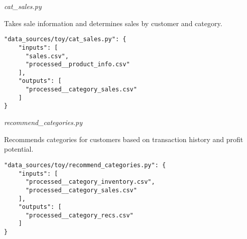 \documentclass{llncs}
\newcommand{\+}{\discretionary{\mbox{${\bm\cdot}\mkern-1mu$}}{}{}}
\begin{document}
\begin{description}
   \item \textit{cat\_sales.py}
   \item[Description:] Takes sale information and determines sales by customer and category.
   \item[Results:] 
\end{description}
\begin{lstlisting}
"data_sources/toy/cat_sales.py": {
    "inputs": [
      "sales.csv",
      "processed__product_info.csv"
    ],
    "outputs": [
      "processed__category_sales.csv"
    ]
}
   \end{lstlisting}

\begin{description}
   \item \textit{recommend\_categories.py}
   \item[Description:] Recommends categories for customers based on transaction history and profit potential.
   \item[Results:] 
\end{description}
\begin{lstlisting}
"data_sources/toy/recommend_categories.py": {
    "inputs": [
      "processed__category_inventory.csv",
      "processed__category_sales.csv"
    ],
    "outputs": [
      "processed__category_recs.csv"
    ]
}
   \end{lstlisting}
\end{document}
